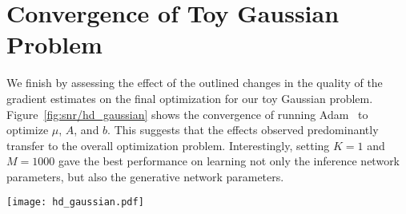
\section{Convergence of Toy Gaussian Problem}
\label{sec:app:toy-Gauss}

We finish by assessing the effect of the outlined changes in the quality
of the gradient estimates on the final optimization for our toy Gaussian problem.  Figure~\ref{fig:snr/hd_gaussian}
shows the convergence of running Adam~\citep{kingma2014adam} to optimize $\mu$, $A$, 
and $b$.  This suggests that the effects observed predominantly transfer to the overall
optimization problem.  Interestingly, setting $K=1$ and $M=1000$ gave the best performance
on learning not only the inference network parameters, but also the generative network
parameters.
\begin{figure*}[h]
	\texttt{[image: hd\_gaussian.pdf]}
	\caption{Convergence of optimization for different values of $K$ and $M$. 
		\emph{(Top, left)} $\ELBO_{\text{IS}}$ during training
		(note this represents a different metric for different $K$). \emph{(Top, right)} $L_2$ distance of the generative network parameters from the true maximizer. \emph{(Bottom)} $L_2$ distance of the inference network parameters from the true maximizer. Plots show means over $3$ repeats with $\pm 1$ standard deviation. Optimization is performed using the Adam algorithm with all parameters initialized by sampling from the uniform distribution on $[1.5, 2.5]$.}
	\label{fig:snr/hd_gaussian}
\end{figure*}